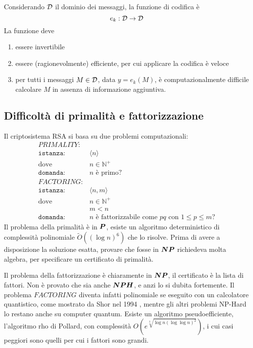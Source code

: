 Considerando $\mathcal{D}$ il dominio dei messaggi, la funzione di codifica è 
\begin{equation*}
    e_k : \mathcal{D} \to \mathcal{D}
\end{equation*}
La funzione deve
\begin{enumerate}
    \item 
        essere invertibile
    \item 
        essere (ragionevolmente) efficiente, per cui applicare la codifica è veloce
    \item 
        per tutti i messaggi $
        M \in \mathcal{D}
        $, data $
        y = e_k(M)
        $, è computazionalmente difficile calcolare $M$ in assenza di informazione aggiuntiva.
\end{enumerate}

\subsection{Difficoltà di primalità e fattorizzazione}

Il criptosistema RSA si basa su due problemi computazionali:
\begin{align*}
    PRIMALITY: & \\
    \texttt{istanza:} \quad &
    \langle
        n
    \rangle
    \\
    \text{dove} \quad &
    n \in \mathbb{N}^+
    \\
    \texttt{domanda:} \quad &
    n \text{ è primo?}
    \\
    FACTORING: & \\
    \texttt{istanza:} \quad &
    \langle
    n, m
    \rangle
    \\
    \text{dove} \quad &
    n \in \mathbb{N}^+
    \\
    & m < n
    \\
    \texttt{domanda:} \quad &
    \text{$n$ è fattorizzabile come $pq$ con $1 \leq p \leq m$?}
\end{align*}
Il problema della primalità è in $\bm{P}$, esiste un algoritmo deterministico di complessità polinomiale $
\tilde{O}
\left( 
    \left( 
        \log n
    \right)^{6}
\right)
$ che lo risolve.
Prima di avere a disposizione la soluzione esatta, provare che fosse in $\bm{NP}$ richiedeva molta algebra, per specificare un certificato di primalità.

Il problema della fattorizzazione è chiaramente in $\bm{NP}$, il certificato è la lista di fattori.
Non è provato che sia anche $\bm{NPH}$, e anzi lo si dubita fortemente.
Il problema $FACTORING$ diventa infatti polinomiale se eseguito con un calcolatore quantistico, come mostrato da Shor nel 1994 \cite{365700}, mentre gli altri problemi NP-Hard lo restano anche su computer quantum.
Esiste un algoritmo pseudoefficiente, l'algoritmo rho di Pollard, con complessità $
O \left( 
    e^{
        \sqrt[3]{
            \log n
            \left( 
                \log \log n
            \right)^{2}
        }
    }
\right)
$, i cui casi peggiori sono quelli per cui i fattori sono grandi.


